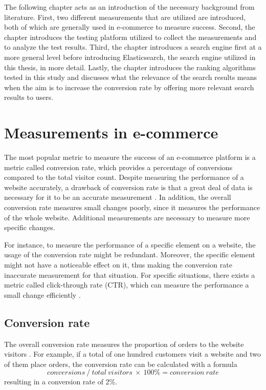 

The following chapter acts as an introduction of the necessary background from literature.
First, two different measurements that are utilized are introduced, 
both of which are generally used in e-commerce to measure success.
Second, the chapter introduces the testing platform utilized to collect the measurements
and to analyze the test results.
Third, the chapter introduces a search engine first at a more general level before introducing
Elasticsearch, the search engine utilized in this thesis, in more detail.
Lastly, the chapter introduces the ranking algorithms tested in this study and discusses
what the relevance of the search results means
when the aim is to increase the conversion rate by offering more relevant search results to users.



\section{Measurements in e-commerce}
\label{sec:measurements}

The most popular metric to measure the success of an e-commerce platform 
is a metric called conversion rate,
which provides a percentage of conversions compared to the total visitor count.
Despite measuring the performance of a website accurately, 
a drawback of conversion rate is that a great deal of data is necessary for it to be an accurate measurement 
\cite{conversionRateWhat}.
In addition, the overall conversion rate measures small changes poorly, 
since it measures the performance of the whole website.
Additional measurements are necessary to measure more specific changes.


For instance, to measure the performance of a specific element on a website, 
the usage of the conversion rate might be redundant. 
Moreover, the specific element might not have a noticeable effect on it, 
thus making the conversion rate inaccurate measurement for that situation.
For specific situations, there exists a metric called click-through rate (CTR), 
which can measure the performance a small change efficiently \cite{ctrWhat}.


\subsection{Conversion rate}
\label{ss:conversion}
The overall conversion rate measures the proportion of orders to the website visitors \cite{conversionRate}.
For example, if a total of one hundred customers visit a website and two of them place orders, 
the conversion rate can be calculated with a formula
\[conversions\ /\ total\ visitors\ \times\ 100\% = conversion\ rate \]
resulting in a conversion rate of 2\%.

